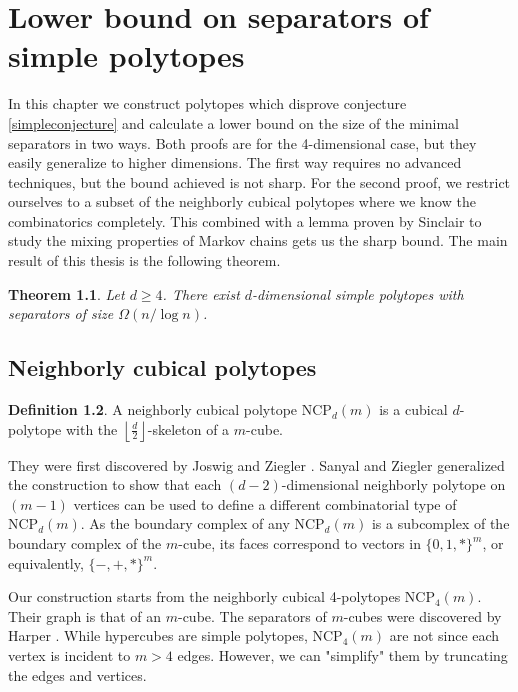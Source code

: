 \documentclass[a4paper,12pt]{book}
\theoremstyle{plain}
\newtheorem{theorem}{Theorem}[section]
\theoremstyle{definition}
\newtheorem{definition}[theorem]{Definition}
\newcommand\NC{\textrm{NCP}}
\begin{document}
\chapter{Lower bound on separators of simple polytopes}
\label{ncpconstruction}

In this chapter we construct polytopes which disprove conjecture \ref{simpleconjecture} and
calculate a lower bound on the size of the minimal separators in two ways. Both proofs are for the
4-dimensional case, but they easily generalize to higher dimensions. The first way requires
no advanced techniques, but the bound achieved is not sharp. For the second proof,
we restrict ourselves to a subset of the neighborly cubical polytopes where we know the 
combinatorics completely. This combined with a lemma proven by Sinclair to study
the mixing properties of Markov chains gets us the sharp bound. The main result of this
thesis is the following theorem.


\begin{theorem}
\label{maintheorem}
 Let $d\geq 4$. There exist $d$-dimensional simple polytopes with
separators of size $\Omega(n/\log n)$.
\end{theorem}

\section{Neighborly cubical polytopes}
\label{ncp}

\begin{definition}
A neighborly cubical polytope $\NC_d(m)$ is a cubical $d$-polytope with the $\left\lfloor \frac{d}{2} 
\right\rfloor$-skeleton of a $m$-cube.
\end{definition}

They were first discovered by Joswig and Ziegler \cite{Z62}. Sanyal and Ziegler \cite{Z102}
generalized the construction to show that each $(d-2)$-dimensional neighborly 
polytope on $(m-1)$ vertices can be used to define a 
different combinatorial type of $\NC_d(m)$. As the boundary complex of any $\NC_d(m)$
is a subcomplex of the boundary complex of the $m$-cube, its faces correspond to vectors
in $\{0,1,*\}^m$, or equivalently, $\{-,+,*\}^m$.


Our construction starts from the neighborly cubical 4-polytopes $\NC_4(m)$. 
Their graph is that of an $m$-cube. The separators of $m$-cubes were discovered by Harper 
\cite{Harp}.
While hypercubes are simple polytopes, $\NC_4(m)$ are not since each vertex is 
incident to $m>4$ edges. However, we can "simplify" them by 
truncating the edges and vertices.
\end{document}

